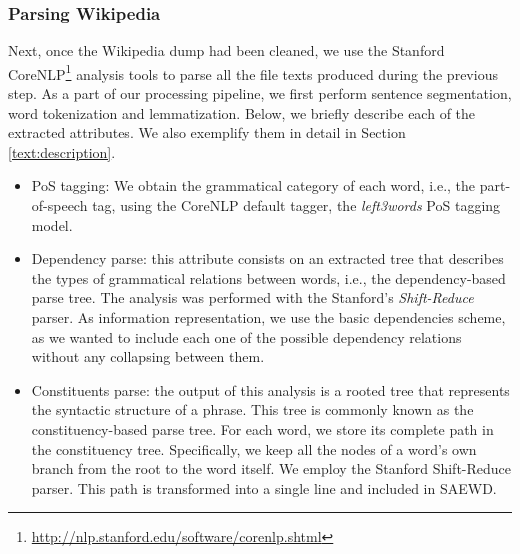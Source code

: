 \subsubsection{Parsing Wikipedia} Next, once the Wikipedia dump had been cleaned, we use the Stanford CoreNLP\footnote{\url{http://nlp.stanford.edu/software/corenlp.shtml}} \cite{manning2014} analysis tools to parse all the file texts produced during the previous step. As a part of our processing pipeline, we first perform  sentence segmentation, word tokenization and lemmatization. Below, we briefly describe each of the extracted attributes. We also exemplify them in detail in Section \ref{text:description}.
\begin{itemize}
\item PoS tagging: We obtain the grammatical category of each word, i.e., the part-of-speech tag, using the CoreNLP default tagger, the \textit{left3words} PoS tagging model.
\item Dependency parse: this attribute consists on an extracted tree that describes the types of grammatical relations between words, i.e., the dependency-based parse tree. 
The analysis was performed with the Stanford's \textit{Shift-Reduce}  parser.
As information representation, we use the basic dependencies scheme, as we wanted to include each one of the possible dependency relations without any collapsing between them.    
                                                                                                                                                                                    
                                                                                                                                                                                    
\item Constituents parse:                                                                                                                                                           
the output of this analysis is a rooted tree that represents the syntactic structure of a phrase.                                                                                  
This tree is commonly known as the constituency-based parse tree.                                                                                                                  
For each word, we store its complete path in the constituency tree.
 Specifically, we keep all the nodes of a word's own branch from the root to the word itself.
 We employ the Stanford Shift-Reduce parser.
 This path is transformed into a single line and included in SAEWD. 
 

\end{itemize} 	
